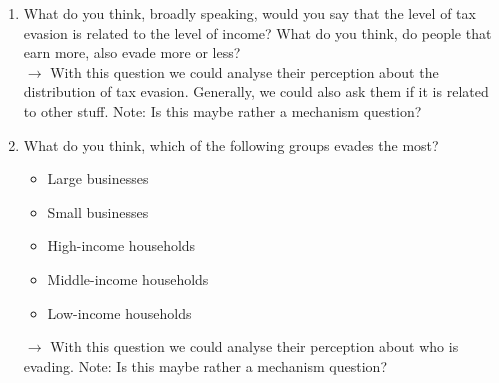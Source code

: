\documentclass[12pt]{article}
\begin{document}
\begin{enumerate}
    \item What do you think, broadly speaking, would you say that the level of tax evasion is related to the level of income? What do you think, do people that earn more, also evade more or less? \\$\rightarrow$ With this question we could analyse their perception about the distribution of tax evasion. Generally, we could also ask them if it is related to other stuff.  Note: Is this maybe rather a mechanism question?
    \item What do you think, which of the following groups evades the most? 
    \begin{itemize}
        \item Large businesses
        \item Small businesses
        \item High-income households
        \item Middle-income households
        \item Low-income households
    \end{itemize}$\rightarrow$ With this question we could analyse their perception about who is evading. Note: Is this maybe rather a mechanism question?
\end{enumerate}
\end{document}
